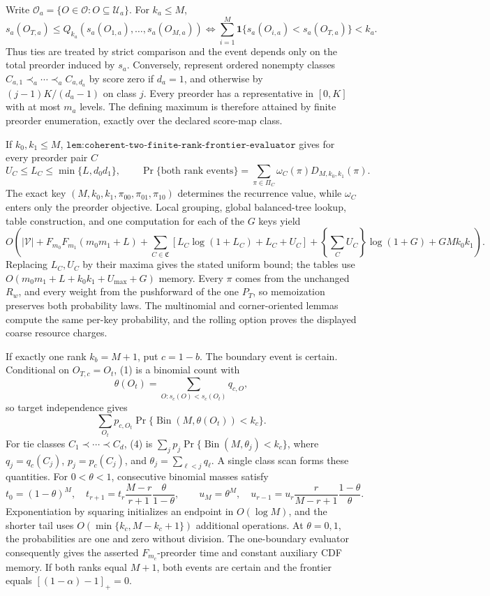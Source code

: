 Write \(\mathcal O_a=\{O\in\mathcal O:O\subseteq\mathcal U_a\}\). For \(k_a\le M\),
\[
s_a(O_{T,a})\le Q_{k_a}(s_a(O_{1,a}),\ldots,s_a(O_{M,a}))\iff\sum_{i=1}^M\mathbf1\{s_a(O_{i,a})<s_a(O_{T,a})\}<k_a.
\tag{1}
\]
Thus ties are treated by strict comparison and the event depends only on the total preorder induced by \(s_a\). Conversely, represent ordered nonempty classes \(C_{a,1}\prec_a\cdots\prec_a C_{a,d_a}\) by score zero if \(d_a=1\), and otherwise by \((j-1)K/(d_a-1)\) on class \(j\). Every preorder has a representative in \([0,K]\) with at most \(m_a\) levels. The defining maximum is therefore attained by finite preorder enumeration, exactly over the declared score-map class.

If \(k_0,k_1\le M\), \(\texttt{lem:coherent-two-finite-rank-frontier-evaluator}\) gives for every preorder pair \(C\)
\[
U_C\le L_C\le\min\{L,d_0d_1\},\qquad \Pr\{\text{both rank events}\}=\sum_{\pi\in\Pi_C}\omega_C(\pi)D_{M,k_0,k_1}(\pi).
\tag{2}
\]
The exact key \((M,k_0,k_1,\pi_{00},\pi_{01},\pi_{10})\) determines the recurrence value, while \(\omega_C\) enters only the preorder objective. Local grouping, global balanced-tree lookup, table construction, and one computation for each of the \(G\) keys yield
\[
O\!\left(|\mathcal V|+F_{m_0}F_{m_1}(m_0m_1+L)+\sum_{C\in\mathfrak C}[L_C\log(1+L_C)+L_C+U_C]+\left\{\sum_CU_C\right\}\log(1+G)+GMk_0k_1\right).
\tag{3}
\]
Replacing \(L_C,U_C\) by their maxima gives the stated uniform bound; the tables use \(O(m_0m_1+L+k_0k_1+U_{\max}+G)\) memory. Every \(\pi\) comes from the unchanged \(R_w\), and every weight from the pushforward of the one \(P_T\), so memoization preserves both probability laws. The multinomial and corner-oriented lemmas compute the same per-key probability, and the rolling option proves the displayed coarse resource charges.

If exactly one rank \(k_b=M+1\), put \(c=1-b\). The boundary event is certain. Conditional on \(O_{T,c}=O_t\), (1) is a binomial count with
\[
\theta(O_t)=\sum_{O:s_c(O)<s_c(O_t)}q_{c,O},
\]
so target independence gives
\[
\sum_{O_t}p_{c,O_t}\Pr\{\operatorname{Bin}(M,\theta(O_t))<k_c\}.
\tag{4}
\]
For tie classes \(C_1\prec\cdots\prec C_d\), (4) is \(\sum_jp_j\Pr\{\operatorname{Bin}(M,\theta_j)<k_c\}\), where \(q_j=q_c(C_j)\), \(p_j=p_c(C_j)\), and \(\theta_j=\sum_{\ell<j}q_\ell\). A single class scan forms these quantities. For \(0<\theta<1\), consecutive binomial masses satisfy
\[
t_0=(1-\theta)^M,\quad t_{r+1}=t_r\frac{M-r}{r+1}\frac{\theta}{1-\theta},
\qquad
u_M=\theta^M,\quad u_{r-1}=u_r\frac r{M-r+1}\frac{1-\theta}{\theta}.
\tag{5}
\]
Exponentiation by squaring initializes an endpoint in \(O(\log M)\), and the shorter tail uses \(O(\min\{k_c,M-k_c+1\})\) additional operations. At \(\theta=0,1\), the probabilities are one and zero without division. The one-boundary evaluator consequently gives the asserted \(F_{m_c}\)-preorder time and constant auxiliary CDF memory. If both ranks equal \(M+1\), both events are certain and the frontier equals \([(1-\alpha)-1]_+=0\).

